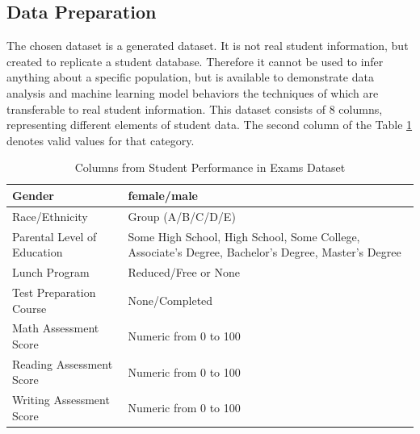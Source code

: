 \documentclass[man,floatsintext]{apa6} %
\begin{document}
\subsection{Data Preparation}
The chosen dataset \cite{dataset} is a generated dataset. It is not real student information, but created to replicate a student database. Therefore it cannot be used to infer anything about a specific population, but is available to demonstrate data analysis and machine learning model behaviors the techniques of which are transferable to real student information. This dataset consists of 8 columns, representing different elements of student data.  The second column of the Table \ref{tab:datasetCol} denotes valid values for that category.
\begin{table}[H]
    \centering
    \begin{tabular}{|l|p{8cm}|}
    \hline
        Gender & female/male\\
        \hline
        Race/Ethnicity & Group (A/B/C/D/E)\\
        \hline
        Parental Level of Education & Some High School, High School, Some College, Associate's Degree, Bachelor's Degree, Master's Degree\\
        \hline
        Lunch Program & Reduced/Free or None\\
        \hline
        Test Preparation Course & None/Completed\\
        \hline
        Math Assessment Score & Numeric from 0 to 100\\
        \hline
        Reading Assessment Score & Numeric from 0 to 100\\
        \hline
        Writing Assessment Score & Numeric from 0 to 100\\
        \hline
    \end{tabular}
    \caption{Columns from Student Performance in Exams Dataset}
    \label{tab:datasetCol}
\end{table}
\end{document}
